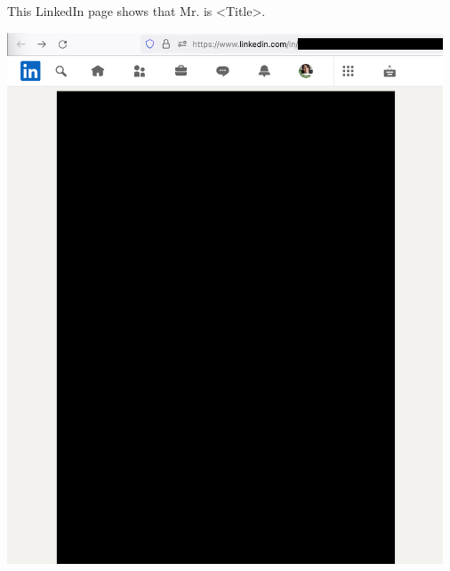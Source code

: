 
This LinkedIn page shows that Mr. \MrCalltouch is <Title>.

\begin{center}
    \includegraphics[width=35em]{calltouch-linkedin-p1_public}
\end{center}
\WillContinue
\pagebreak

